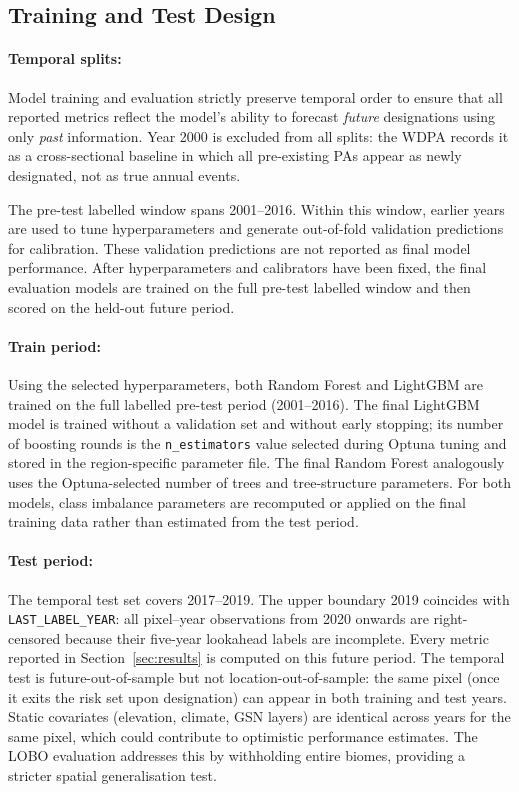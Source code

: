 \documentclass[12pt]{article}
\theoremstyle{break}
\begin{document}
\subsection{Training and Test Design}
\label{sec:splits}

\paragraph{Temporal splits:}
Model training and evaluation strictly preserve temporal order to ensure that all
reported metrics reflect the model's ability to forecast \emph{future} designations
using only \emph{past} information. Year 2000 is excluded from all splits: the WDPA
records it as a cross-sectional baseline in which all pre-existing PAs appear as
newly designated, not as true annual events.

The pre-test labelled window spans 2001--2016. Within this window, earlier years are
used to tune hyperparameters and generate out-of-fold validation predictions for
calibration. These validation predictions are not reported as final model performance.
After hyperparameters and calibrators have been fixed, the final evaluation models are
trained on the full pre-test labelled window and then scored on the held-out future
period.

\paragraph{Train period:}
Using the selected hyperparameters, both Random Forest and LightGBM are trained on
the full labelled pre-test period (2001--2016). The final LightGBM model is trained
without a validation set and without early stopping; its number of boosting rounds is
the \texttt{n\_estimators} value selected during Optuna tuning and stored in the
region-specific parameter file. The final Random Forest analogously uses the
Optuna-selected number of trees and tree-structure parameters. For both models, class
imbalance parameters are recomputed or applied on the final training data rather than
estimated from the test period.

\paragraph{Test period:}
The temporal test set covers 2017--2019. The upper boundary 2019 coincides with
\texttt{LAST\_LABEL\_YEAR}: all pixel--year observations from 2020 onwards are
right-censored because their five-year lookahead labels are incomplete. Every metric
reported in Section~\ref{sec:results} is computed on this future period. The temporal
test is future-out-of-sample but not location-out-of-sample: the same pixel (once it
exits the risk set upon designation) can appear in both training and test years.
Static covariates (elevation, climate, GSN layers) are identical across years for the
same pixel, which could contribute to optimistic performance estimates. The LOBO
evaluation addresses this by withholding entire biomes, providing a stricter spatial
generalisation test.
\end{document}

